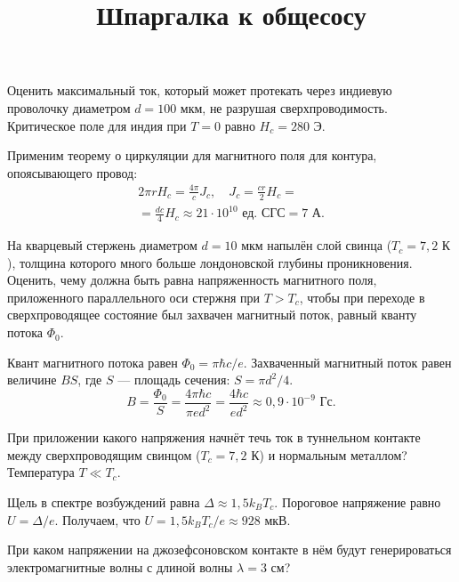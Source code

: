 \documentclass[10pt,landscape,a4paper]{article}
\title{Шпаргалка к общесосу}
\begin{document}
\small
\begin{multicols*}{5}

\begin{hiProb}[0-9-1]
Оценить максимальный ток, который может протекать через индиевую проволочку диаметром $d=100 \text{ мкм}$, не разрушая сверхпроводимость. Критическое поле для индия при $T=0$ равно $H_c=280\text{ Э}$.
\end{hiProb}
\begin{sol}
Применим теорему о циркуляции для магнитного
поля для контура, опоясывающего провод:
\begin{multline*}
2\pi r H_c= \frac{4\pi}{c}J_c,\quad
J_c= \frac{cr}{2}H_c=\\= \frac{dc}{4} H_c\approx 21\cdot 10^{10} \text{ ед. СГС}=7 \text{ А}
.\end{multline*} 
\end{sol}
\begin{hiProb}[0-9-2]
	На кварцевый стержень диаметром  $d=10 \text{ мкм}$ напылён слой свинца ($T_c=7,2\text{ К}$), толщина которого много больше лондоновской глубины проникновения. Оценить, чему должна быть равна напряженность магнитного поля, приложенного параллельного оси стержня при $T>T_c$, чтобы при переходе в сверхпроводящее состояние был захвачен магнитный поток, равный кванту потока $\Phi_0$.
\end{hiProb}
\begin{sol}
Квант магнитного потока равен
$
\Phi_0= \pi \hbar c /e
.$ 
Захваченный магнитный поток равен величине $BS$, где $S$ 
--- площадь сечения: 
$
S= \pi d^2 /4.$ 
\[
B=
\frac{\Phi_0}{S}= \frac{4\pi \hbar c}{\pi e d^2}=
\frac{4\hbar c}{ed^2}\approx 0,9 \cdot 10^{-9}\text{ Гс}
.\] 
\end{sol}
\begin{hiProb}[0-10-1]
При приложении какого напряжения начнёт течь ток в туннельном контакте между сверхпроводящим свинцом ($T_c=7,2\text{ К}$) и нормальным металлом? Температура $T\ll T_c$.
\end{hiProb}
\begin{sol}
Щель в спектре возбуждений равна $\Delta \approx 1,5 k_B T_c$. Пороговое напряжение равно $U= \Delta /e$. Получаем,
что $U= 1,5k_B T_c /e\approx 928\text{ мкВ}$.
\end{sol}
\begin{hiProb}[0-10-2]
При каком напряжении на джозефсоновском контакте в нём будут генерироваться электромагнитные волны с длиной волны $\lambda=3\text{ см}$?
\end{hiProb}
\begin{sol}

\end{sol}
\end{multicols*}
\end{document}
